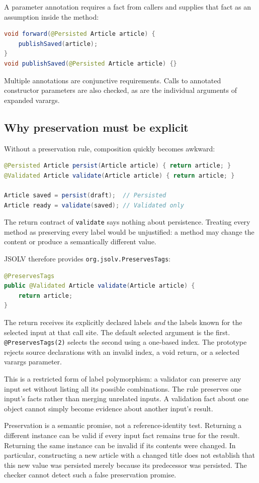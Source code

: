 \documentclass[11pt]{article}
\newcommand{\jsolv}{\textsc{JSOLV}}
\begin{document}
A parameter annotation requires a fact from callers and supplies that fact as
an assumption inside the method:
\begin{lstlisting}[language=Java]
void forward(@Persisted Article article) {
    publishSaved(article);
}
void publishSaved(@Persisted Article article) {}
\end{lstlisting}
Multiple annotations are conjunctive requirements. Calls to annotated constructor
parameters are also checked, as are the individual arguments of expanded varargs.

\subsection{Why preservation must be explicit}

Without a preservation rule, composition quickly becomes awkward:
\begin{lstlisting}[language=Java]
@Persisted Article persist(Article article) { return article; }
@Validated Article validate(Article article) { return article; }

Article saved = persist(draft);  // Persisted
Article ready = validate(saved); // Validated only
\end{lstlisting}
The return contract of \texttt{validate} says nothing about persistence.
Treating every method as preserving every label would be unjustified: a method
may change the content or produce a semantically different value.

\jsolv{} therefore provides \texttt{org.jsolv.PreservesTags}:
\begin{lstlisting}[language=Java]
@PreservesTags
public @Validated Article validate(Article article) {
    return article;
}
\end{lstlisting}
The return receives its explicitly declared labels \emph{and} the labels known
for the selected input at that call site. The default selected argument is the
first. \texttt{@PreservesTags(2)} selects the second using a one-based index.
The prototype rejects source declarations with an invalid index, a void return,
or a selected varargs parameter.

This is a restricted form of label polymorphism: a validator can preserve any
input set without listing all its possible combinations. The rule preserves one
input's facts rather than merging unrelated inputs. A validation fact about one
object cannot simply become evidence about another input's result.

Preservation is a semantic promise, not a reference-identity test. Returning a
different instance can be valid if every input fact remains true for the result.
Returning the same instance can be invalid if its contents were changed. In
particular, constructing a new article with a changed title does not establish
that this new value was persisted merely because its predecessor was persisted.
The checker cannot detect such a false preservation promise.
\end{document}
